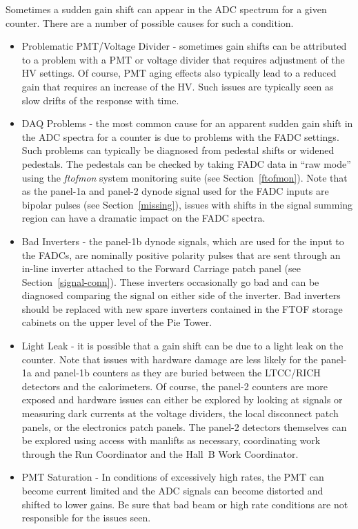 \documentclass[12pt]{article}
\begin{document}
Sometimes a sudden gain shift can appear in the ADC spectrum for a given counter. There 
are a number of possible causes for such a condition.

\begin{itemize}
\item Problematic PMT/Voltage Divider - sometimes gain shifts can be attributed to a
problem with a PMT or voltage divider that requires adjustment of the HV settings. Of
course, PMT aging effects also typically lead to a reduced gain that requires an increase
of the HV. Such issues are typically seen as slow drifts of the response with time.
\item DAQ Problems - the most common cause for an apparent sudden gain shift in the
ADC spectra for a counter is due to problems with the FADC settings. Such problems
can typically be diagnosed from pedestal shifts or widened pedestals. The pedestals can
be checked by taking FADC data in ``raw mode'' using the {\it ftofmon} system monitoring
suite (see Section~\ref{ftofmon}). Note that as the panel-1a and panel-2 dynode signal used
for the FADC inputs are bipolar pulses (see Section~\ref{missing}), issues with shifts in the 
signal summing region can have a dramatic impact on the FADC spectra. 
\item Bad Inverters - the panel-1b dynode signals, which are used for the input to the 
FADCs, are nominally positive polarity pulses that are sent through an in-line inverter 
attached to the Forward Carriage patch panel (see Section~\ref{signal-conn}). These 
inverters occasionally go bad and can be diagnosed comparing the signal on either side 
of the inverter. Bad inverters should be replaced with new spare inverters contained in 
the FTOF storage cabinets on the upper level of the Pie Tower.
\item Light Leak - it is possible that a gain shift can be due to a light leak on the 
counter. Note that issues with hardware damage are less likely for the panel-1a and 
panel-1b counters as they are buried between the LTCC/RICH detectors and the 
calorimeters. Of course, the panel-2 counters are more exposed and hardware issues can 
either be explored by looking at signals or measuring dark currents at the voltage 
dividers, the local disconnect patch panels, or the electronics patch panels. The 
panel-2 detectors themselves can be explored using access with manlifts as necessary, 
coordinating work through the Run Coordinator and the Hall~B Work Coordinator.
\item PMT Saturation - In conditions of excessively high rates, the PMT can become
current limited and the ADC signals can become distorted and shifted to lower gains. Be
sure that bad beam or high rate conditions are not responsible for the issues seen.
\end{itemize}
\end{document}
